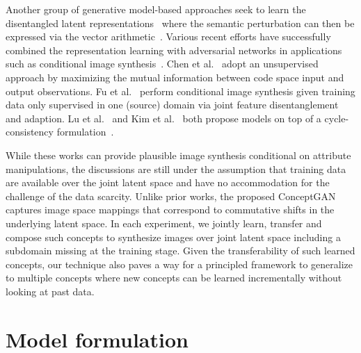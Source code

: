 \documentclass[10pt,twocolumn,letterpaper]{article}
\begin{document}
Another group of generative model-based approaches seek to learn the disentangled latent representations~\cite{VAE, semisup, AAE, inverse, attribute2image} where the semantic perturbation can then be expressed via the vector arithmetic~\cite{word2vec, image2vec}. Various recent efforts have successfully combined the representation learning with adversarial networks in applications such as conditional image synthesis~\cite{auxiliary, rev2_1, rev2_2, rev2_3, rev2_4}. Chen et al.~\cite{InfoGAN} adopt an unsupervised approach by maximizing the mutual information between code space input and output observations. Fu et al.~\cite{CDD} perform conditional image synthesis given training data only supervised in one (source) domain via joint feature disentanglement and adaption. Lu et al.~\cite{cond_cyclegan} and Kim et al.~\cite{attribute_transfer} both propose models on top of a cycle-consistency formulation~\cite{CycleGAN}. 

While these works can provide plausible image synthesis conditional on attribute manipulations, the discussions are still under the assumption that training data are available over the joint latent space and have no accommodation for the challenge of the data scarcity.
Unlike prior works, the proposed ConceptGAN captures image space mappings that correspond to commutative shifts in the underlying latent space. In each experiment, we jointly learn, transfer and compose such concepts to synthesize images over joint latent space including a subdomain missing at the training stage. Given the transferability of such learned concepts, our technique also paves a way for a principled framework to generalize to multiple concepts where new concepts can be learned incrementally without looking at past data.


\section{Model formulation}
\label{sec:model}
\end{document}

